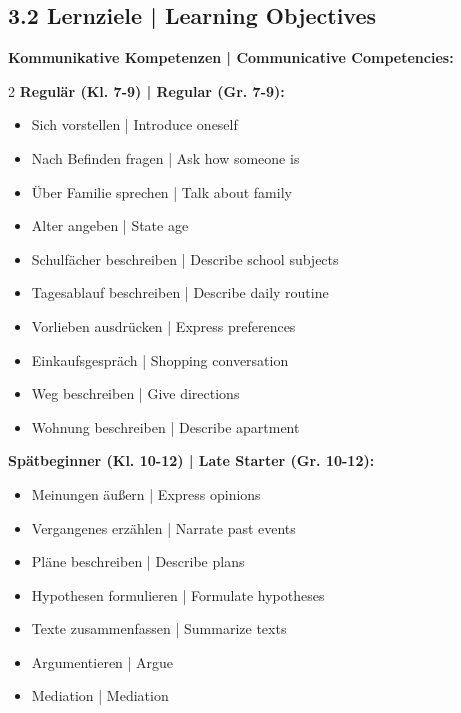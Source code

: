 \documentclass[11pt,a4paper]{article}
\begin{document}
\subsection*{3.2 Lernziele | Learning Objectives}

\textbf{Kommunikative Kompetenzen | Communicative Competencies:}

\begin{multicols}{2}
\textbf{Regulär (Kl. 7-9) | Regular (Gr. 7-9):}
\begin{itemize}[leftmargin=*, nosep]
    \item[$\square$] Sich vorstellen | Introduce oneself
    \item[$\square$] Nach Befinden fragen | Ask how someone is
    \item[$\square$] Über Familie sprechen | Talk about family
    \item[$\square$] Alter angeben | State age
    \item[$\square$] Schulfächer beschreiben | Describe school subjects
    \item[$\square$] Tagesablauf beschreiben | Describe daily routine
    \item[$\square$] Vorlieben ausdrücken | Express preferences
    \item[$\square$] Einkaufsgespräch | Shopping conversation
    \item[$\square$] Weg beschreiben | Give directions
    \item[$\square$] Wohnung beschreiben | Describe apartment
\end{itemize}

\columnbreak

\textbf{Spätbeginner (Kl. 10-12) | Late Starter (Gr. 10-12):}
\begin{itemize}[leftmargin=*, nosep]
    \item[$\square$] Meinungen äußern | Express opinions
    \item[$\square$] Vergangenes erzählen | Narrate past events
    \item[$\square$] Pläne beschreiben | Describe plans
    \item[$\square$] Hypothesen formulieren | Formulate hypotheses
    \item[$\square$] Texte zusammenfassen | Summarize texts
    \item[$\square$] Argumentieren | Argue
    \item[$\square$] Mediation | Mediation
\end{itemize}
\end{multicols}
\end{document}
